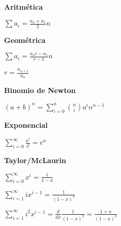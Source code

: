 \begin{minipage}{0.22\textwidth}
	{\bf Aritmética}
	\begin{center} $\sum a_i = \frac {a_n + a_1}{2} n$\end{center}
	{\bf Geométrica}
	\begin{center} $\sum a_i = \frac {a_n{r} - a_1}{r-1} n$\end{center}
	\begin{center} $r = \frac {a_{n+1}}{a_n}$\end{center}
	{\bf Binomio de Newton}
	\begin{center} $(a+b)^n = \sum\limits_{i=0}^{n} \binom{n}{i}a^in^{n-1}$\end{center}
\end{minipage}
\begin{minipage}{0.22\textwidth}
	{\bf Exponencial}
	\begin{center} $\sum\limits_{i=0}^{\infty} \frac {a^i}{i!} = e^a$\end{center}
	{\bf Taylor/McLaurin}
	\begin{center} $\sum\limits_{i=0}^{\infty}  x^i = \frac {1}{1-x}$\end{center}
	\begin{center} $\sum\limits_{i=1}^{\infty}  ix^{i-1} = \frac {1}{(1-x)^2}$\end{center}
	\begin{center} $\sum\limits_{i=1}^{\infty}  i^2x^{i-1} = \frac{d}{dx} \frac {1}{(1-x)^2} = \frac {1+x}{(1-x)^3}$\end{center}
\end{minipage}